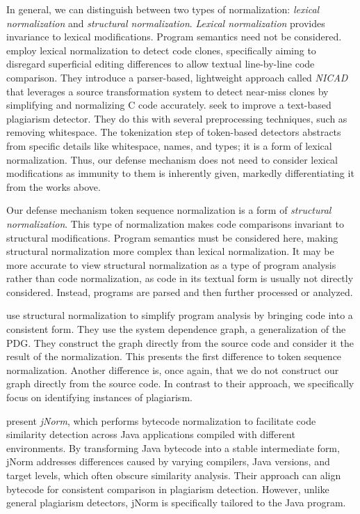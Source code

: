 In general, we can distinguish between two types of normalization: \emph{lexical normalization} and \emph{structural normalization}.
%
\emph{Lexical normalization} provides invariance to lexical modifications. Program semantics need not be considered. \citet{roy2008} employ lexical normalization to detect code clones, specifically aiming to disregard superficial editing differences to allow textual line-by-line code comparison. They introduce a parser-based, lightweight approach called \textit{NICAD} that leverages a source transformation system to detect near-miss clones by simplifying and normalizing C code accurately. %
\citet{allyson2019} seek to improve a text-based plagiarism detector. They do this with several preprocessing techniques, such as removing whitespace.
The tokenization step of token-based detectors abstracts from specific details like whitespace, names, and types; it is a form of lexical normalization. Thus, our defense mechanism does not need to consider lexical modifications as immunity to them is inherently given, markedly differentiating it from the works above.

Our defense mechanism token sequence normalization is a form of \emph{structural normalization}. This type of normalization makes code comparisons invariant to structural modifications. Program semantics must be considered here, making structural normalization more complex than lexical normalization. It may be more accurate to view structural normalization as a type of program analysis rather than code normalization, as code in its textual form is usually not directly considered. Instead, programs are parsed and then further processed or analyzed.

\citet{wang2008} use structural normalization to simplify program analysis by bringing code into a consistent form. They use the system dependence graph, a generalization of the PDG. 
%
They construct the graph directly from the source code and consider it the result of the normalization.
This presents the first difference to token sequence normalization. Another difference is, once again, that we do not construct our graph directly from the source code. In contrast to their approach, we specifically focus on identifying instances of plagiarism.

\citet{Schott2024} present \textit{jNorm}, which performs bytecode normalization to facilitate code similarity detection across Java applications compiled with different environments. By transforming Java bytecode into a stable intermediate form, jNorm addresses differences caused by varying compilers, Java versions, and target levels, which often obscure similarity analysis.
%
Their approach can align bytecode for consistent comparison in plagiarism detection. However, unlike general plagiarism detectors, jNorm is specifically tailored to the Java program.

